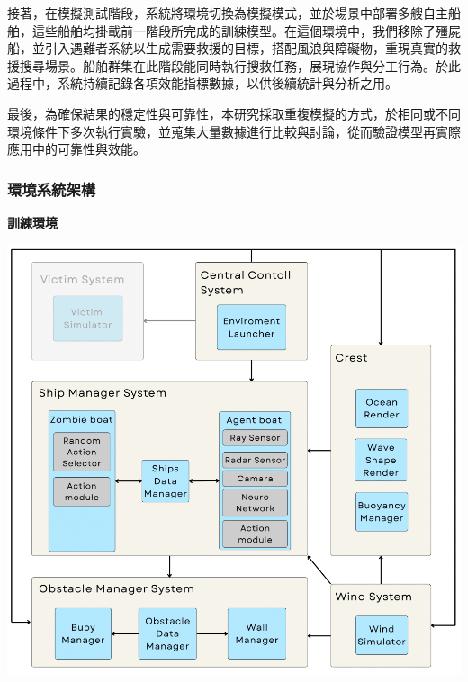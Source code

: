 \documentclass[12pt,a4paper]{ctexart}
\begin{document}
接著，在模擬測試階段，系統將環境切換為模擬模式，並於場景中部署多艘自主船舶，這些船舶均掛載前一階段所完成的訓練模型。在這個環境中，我們移除了殭屍船，並引入遇難者系統以生成需要救援的目標，搭配風浪與障礙物，重現真實的救援搜尋場景。船舶群集在此階段能同時執行搜救任務，展現協作與分工行為。於此過程中，系統持續記錄各項效能指標數據，以供後續統計與分析之用。

最後，為確保結果的穩定性與可靠性，本研究採取重複模擬的方式，於相同或不同環境條件下多次執行實驗，並蒐集大量數據進行比較與討論，從而驗證模型再實際應用中的可靠性與效能。

\newpage

\subsubsection{環境系統架構}

\textbf{訓練環境}
\begin{center}
\includegraphics[scale=0.5]{image/TrainingArchitecture.png}
\end{center}

\newpage
\end{document}
